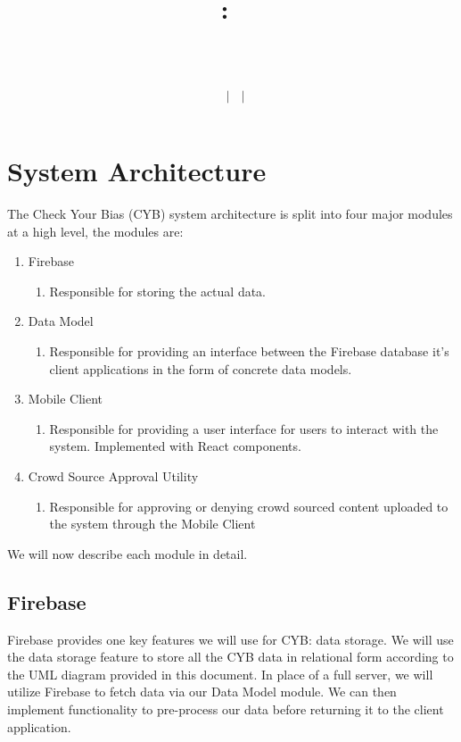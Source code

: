 \documentclass[11pt]{article}
\title{
    \vspace{2in}
    \textmd{\textbf{\hmwkClass:\ \hmwkTitle}}\\
    \vspace{0.1in}\large{\textit{\hmwkClassInstructor\ \hmwkClassTime}}\\
    \author{\textbf{\hmwkAuthorName\ $\vert$ \hmwkAuthorCSE\ $\vert$ \hmwkAuthorId}}
}
\date{}
\begin{document}
\section*{System Architecture}

The Check Your Bias (CYB) system architecture is split into four major modules at a high level, the modules are:

\begin{enumerate}[nolistsep]
    \item Firebase
    \begin{enumerate}
        \item Responsible for storing the actual data.
    \end{enumerate}
    \item Data Model
    \begin{enumerate}
        \item Responsible for providing an interface between the Firebase database it’s client applications in the form of concrete data models.
    \end{enumerate}
    \item Mobile Client
    \begin{enumerate}
        \item Responsible for providing a user interface for users to interact with the system. Implemented with React components.
    \end{enumerate}
    \item Crowd Source Approval Utility
    \begin{enumerate}
        \item Responsible for approving or denying crowd sourced content uploaded to the system through the Mobile Client
    \end{enumerate}
\end{enumerate}

We will now describe each module in detail.

\subsection*{Firebase}

Firebase provides one key features we will use for CYB: data storage. We will use the data storage feature to store all the CYB data in relational form according to the UML diagram provided in this document. In place of a full server, we will utilize Firebase to fetch data via our Data Model module. We can then implement functionality to pre-process our data before returning it to the client application.\\
\end{document}
